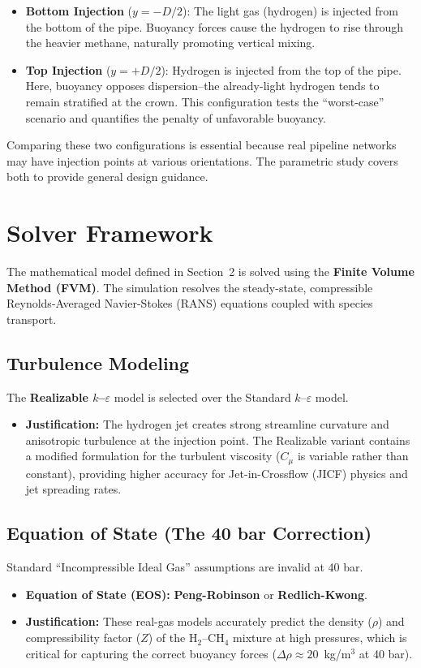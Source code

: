 \documentclass[12pt, a4paper]{report}
\begin{document}
\begin{itemize}
    \item \textbf{Bottom Injection} ($y = -D/2$): The light gas (hydrogen) is injected from the bottom of the pipe. Buoyancy forces cause the hydrogen to rise through the heavier methane, naturally promoting vertical mixing.
    \item \textbf{Top Injection} ($y = +D/2$): Hydrogen is injected from the top of the pipe. Here, buoyancy opposes dispersion--the already-light hydrogen tends to remain stratified at the crown. This configuration tests the ``worst-case'' scenario and quantifies the penalty of unfavorable buoyancy.
\end{itemize}

\noindent Comparing these two configurations is essential because real pipeline networks may have injection points at various orientations. The parametric study covers both to provide general design guidance.

\section{Solver Framework}
The mathematical model defined in Section~2 is solved using the \textbf{Finite Volume Method (FVM)}. The simulation resolves the steady-state, compressible Reynolds-Averaged Navier-Stokes (RANS) equations coupled with species transport.

\subsection{Turbulence Modeling}
The \textbf{Realizable $k$--$\varepsilon$} model is selected over the Standard $k$--$\varepsilon$ model.
\begin{itemize}
    \item \textbf{Justification:} The hydrogen jet creates strong streamline curvature and anisotropic turbulence at the injection point. The Realizable variant contains a modified formulation for the turbulent viscosity ($C_\mu$ is variable rather than constant), providing higher accuracy for Jet-in-Crossflow (JICF) physics and jet spreading rates.
\end{itemize}

\subsection{Equation of State (The 40 bar Correction)}
Standard ``Incompressible Ideal Gas'' assumptions are invalid at 40 bar.
\begin{itemize}
    \item \textbf{Equation of State (EOS):} \textbf{Peng-Robinson} or \textbf{Redlich-Kwong}.
    \item \textbf{Justification:} These real-gas models accurately predict the density ($\rho$) and compressibility factor ($Z$) of the H$_2$--CH$_4$ mixture at high pressures, which is critical for capturing the correct buoyancy forces ($\Delta \rho \approx 20$~kg/m$^3$ at 40 bar).
\end{itemize}
\end{document}
